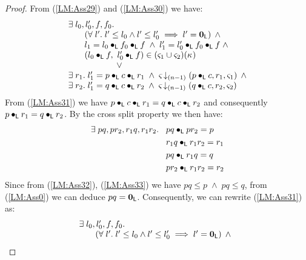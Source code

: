 \begin{lemma}[]
\begin{proof}
From (\ref{LM:Ass29}) and (\ref{LM:Ass30}) we have:
%
\begin{align}
	\begin{array}{l}
		\exsts{l_0, l'_0, f, f_0} \\
	  \hspace*{0.5cm}
	  \begin{array}{l}
	  	\left(\for{l'} l' \leq l_0 \land l' \leq l'_0 \implies l' = \unitL\right)\;\land\\
	  	l_1 = l_0 \composeL f_0 \composeL f \;\land\; l'_1 = l'_0 \composeL f_0 \composeL f  \;\land\\
	  	(l_0 \composeL f,\ l'_0 \composeL f) \in (\amod{1} \cup \amod{2})(\ca{}) 
	  \end{array} \\
%
		\hspace*{2cm}\lor  \\
		\exsts{r_1} l'_1 = p \composeL c \composeL r_1 \;\land\; \extendsAMUpto{\amod}{(n-1)}{p \composeL c}{r_1}{\amod{1}} \;\land\\
%
		\exsts{r_2} l'_1 = q \composeL c \composeL r_2 \;\land\; \extendsAMUpto{\amod}{(n-1)}{q \composeL c}{r_2}{\amod{2}}
	\end{array} \label{LM:Ass31}
\end{align}
From (\ref{LM:Ass31}) we have $p \bullet_{\textsf{L}} c \bullet_{\textsf{L}} r_1 = q \bullet_{\textsf{L}} c \bullet_{\textsf{L}} r_2$ and consequently $p \bullet_{\textsf{L}} r_1 = q \bullet_{\textsf{L}} r_2$. By the cross split property we then have:
%
\begin{align}
	\exists\; pq, pr_2, r_1q, r_1r_2.\; \hspace*{0.2cm}& pq  \bullet_{\textsf{L}} pr_2 = p \label{LM:Ass32}\\
	& r_1q \bullet_{\textsf{L}} r_1r_2 = r_1 \label{LM:Ass33}\\
	& pq \bullet_{\textsf{L}} r_1q = q \label{LM:Ass34}\\
	& pr_2 \bullet_{\textsf{L}} r_1r_2 = r_2 \label{LM:Ass35}
\end{align}
Since from (\ref{LM:Ass32}), (\ref{LM:Ass33}) we have $pq \leq p \;\land\; pq \leq q$, from (\ref{LM:Ass0}) we can deduce $pq = \mathbf{0}_{\textsf{L}}$. Consequently, we can rewrite (\ref{LM:Ass31}) as:
%
\begin{align}
	\begin{array}{l}
		\exists\; l_0, l'_0, f, f_0.\; \\
	  \hspace*{0.5cm}
	  \begin{array}{l}
	  	\left(\forall\; l'.\; l' \leq l_0 \land l' \leq l'_0 \implies l' = \mathbf{0}_{\textsf{L}}\right)\;\land\\

\end{array}
\end{array}
\end{align}
\end{proof}
\end{lemma}
